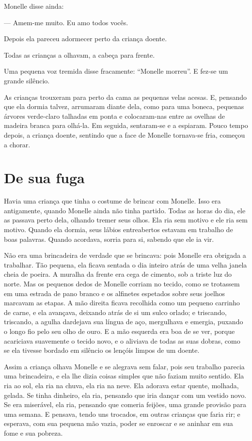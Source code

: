 Monelle disse ainda:

--- Amem-me muito. Eu amo todos vocês.

Depois ela pareceu adormecer perto da criança doente.

Todas as crianças a olhavam, a cabeça para frente.

Uma pequena voz tremida disse fracamente: “Monelle morreu”. E fez-se um
grande silêncio.

As crianças trouxeram para perto da cama as pequenas velas acesas. E,
pensando que ela dormia talvez, arrumaram diante dela, como para uma
boneca, pequenas árvores verde-claro talhadas em ponta e colocaram-nas
entre as ovelhas de madeira branca para olhá-la. Em seguida, sentaram-se e
a espiaram. Pouco tempo depois, a criança doente, sentindo que a face de
Monelle tornava-se fria, começou a chorar.

\section*{De sua fuga}

Havia uma criança que tinha o costume de brincar com Monelle. Isso era
antigamente, quando Monelle ainda não tinha partido. Todas as horas do
dia, ele as passava perto dela, olhando tremer seus olhos. Ela ria sem
motivo e ele ria sem motivo. Quando ela dormia, seus lábios entreabertos
estavam em trabalho de boas palavras. Quando acordava, sorria para si,
sabendo que ele ia vir.

Não era uma brincadeira de verdade que se brincava: pois Monelle era
obrigada a trabalhar. Tão pequena, ela ficava sentada o dia inteiro atrás
de uma velha janela cheia de poeira. A muralha da frente era cega de
cimento, sob a triste luz do norte. Mas os pequenos dedos de Monelle
corriam no tecido, como se trotassem em uma estrada de pano branco e os
alfinetes espetados sobre seus joelhos marcavam as etapas. A mão direita
ficava recolhida como um pequeno carrinho de carne, e ela avançava,
deixando atrás de si um sulco orlado; e triscando, triscando, a agulha
dardejava sua língua de aço, mergulhava e emergia, puxando o longo fio
pelo seu olho de ouro. E a mão esquerda era boa de se ver, porque
acariciava suavemente o tecido novo, e o aliviava de todas as suas dobras,
como se ela tivesse bordado em silêncio os lençóis limpos de um doente.

Assim a criança olhava Monelle e se alegrava sem falar, pois seu
trabalho parecia uma brincadeira, e ela lhe dizia coisas simples que não
faziam muito sentido. Ela ria ao sol, ela ria na chuva, ela ria na neve.
Ela adorava estar quente, molhada, gelada. Se tinha dinheiro, ela ria,
pensando que iria dançar com um vestido novo. Se era miserável, ela ria,
pensando que comeria feijões, uma grande provisão para uma semana. E
pensava, tendo uns trocados, em outras crianças que faria rir; e esperava,
com sua pequena mão vazia, poder se enroscar e se aninhar em sua fome e
sua pobreza.

